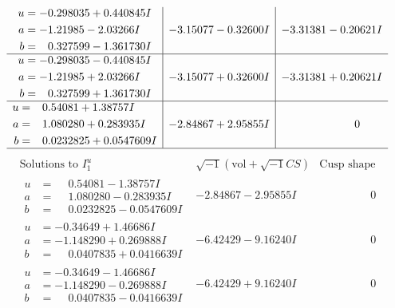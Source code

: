 \documentclass[1p]{elsarticle_modified}
\theoremstyle{definition}
\newcommand{\I}{\sqrt{-1}}
\begin{document}
$$\begin{array}{c|c|c}
\begin{aligned}
u &= -0.298035 + 0.440845 I \\
a &= -1.21985 - 2.03266 I \\
b &= \phantom{-}0.327599 - 1.361730 I\end{aligned}
 & -3.15077 - 0.32600 I & -3.31381 - 0.20621 I \\ \hline\begin{aligned}
u &= -0.298035 - 0.440845 I \\
a &= -1.21985 + 2.03266 I \\
b &= \phantom{-}0.327599 + 1.361730 I\end{aligned}
 & -3.15077 + 0.32600 I & -3.31381 + 0.20621 I \\ \hline\begin{aligned}
u &= \phantom{-}0.54081 + 1.38757 I \\
a &= \phantom{-}1.080280 + 0.283935 I \\
b &= \phantom{-}0.0232825 + 0.0547609 I\end{aligned}
 & -2.84867 + 2.95855 I & \phantom{-0.000000 } 0\\
 \hline 
 \end{array}$$\newpage$$\begin{array}{c|c|c}  
\text{Solutions to }I^u_{1}& \I (\text{vol} + \sqrt{-1}CS) & \text{Cusp shape}\\
 \hline 
\begin{aligned}
u &= \phantom{-}0.54081 - 1.38757 I \\
a &= \phantom{-}1.080280 - 0.283935 I \\
b &= \phantom{-}0.0232825 - 0.0547609 I\end{aligned}
 & -2.84867 - 2.95855 I & \phantom{-0.000000 } 0 \\ \hline\begin{aligned}
u &= -0.34649 + 1.46686 I \\
a &= -1.148290 + 0.269888 I \\
b &= \phantom{-}0.0407835 + 0.0416639 I\end{aligned}
 & -6.42429 - 9.16240 I & \phantom{-0.000000 } 0 \\ \hline\begin{aligned}
u &= -0.34649 - 1.46686 I \\
a &= -1.148290 - 0.269888 I \\
b &= \phantom{-}0.0407835 - 0.0416639 I\end{aligned}
 & -6.42429 + 9.16240 I & \phantom{-0.000000 } 0 \\ \hline\begin{aligned}

\end{aligned}
\end{array}$$
\end{document}
